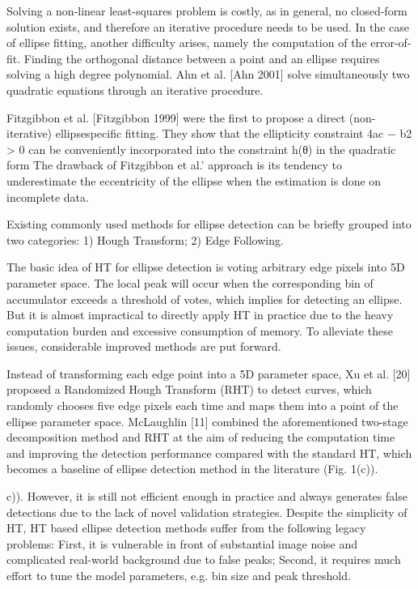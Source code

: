 \documentclass[a4paper]{report}
\begin{document}
Solving a non-linear least-squares problem is costly, as in general, no closed-form solution
exists, and therefore an iterative procedure needs to be used. In the case of ellipse fitting,
another difficulty arises, namely the computation of the error-of-fit. Finding the orthogonal
distance between a point and an ellipse requires solving a high degree polynomial.
Ahn et al. [Ahn 2001] solve simultaneously two quadratic equations through
an iterative procedure. 

Fitzgibbon et al. [Fitzgibbon 1999] were the first to propose a direct (non-iterative) ellipsespecific
fitting. They show that the ellipticity constraint 4ac − b2 > 0 can be conveniently
incorporated into the constraint h(θ) in the quadratic form
The drawback of Fitzgibbon et al.’
approach is its tendency to underestimate the eccentricity of the ellipse when the estimation is
done on incomplete data.



Existing commonly used methods for ellipse detection can
be briefly grouped into two categories: 1) Hough Transform;
2) Edge Following.

The basic idea of HT for ellipse
detection is voting arbitrary edge pixels into 5D parameter
space. The local peak will occur when the corresponding bin
of accumulator exceeds a threshold of votes, which implies
for detecting an ellipse. But it is almost impractical to directly
apply HT in practice due to the heavy computation burden and
excessive consumption of memory. To alleviate these issues,
considerable improved methods are put forward.

Instead of transforming each edge point into
a 5D parameter space, Xu et al. [20] proposed a Randomized
Hough Transform (RHT) to detect curves, which randomly
chooses five edge pixels each time and maps them into a point
of the ellipse parameter space. McLaughlin [11] combined the
aforementioned two-stage decomposition method and RHT
at the aim of reducing the computation time and improving
the detection performance compared with the standard HT,
which becomes a baseline of ellipse detection method in the
literature (Fig. 1(c)).

c)). However, it is still not efficient enough in
practice and always generates false detections due to the lack
of novel validation strategies. Despite the simplicity of HT,
HT based ellipse detection methods suffer from the following
legacy problems: First, it is vulnerable in front of substantial
image noise and complicated real-world background due to
false peaks; Second, it requires much effort to tune the model
parameters, e.g. bin size and peak threshold.
\end{document}
